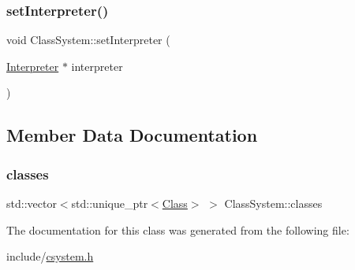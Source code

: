 \subsubsection{\texorpdfstring{set\+Interpreter()}{setInterpreter()}}
{\footnotesize\ttfamily void Class\+System\+::set\+Interpreter (\begin{DoxyParamCaption}\item[{\hyperlink{classInterpreter}{Interpreter} $\ast$}]{interpreter }\end{DoxyParamCaption})}



\subsection{Member Data Documentation}
\mbox{\label{classClassSystem_afdfbb54eb10abf323371cb9bb4f639a2}} 
\subsubsection{\texorpdfstring{classes}{classes}}
{\footnotesize\ttfamily std\+::vector$<$std\+::unique\+\_\+ptr$<$\hyperlink{classClass}{Class}$>$ $>$ Class\+System\+::classes}



The documentation for this class was generated from the following file\+:\begin{DoxyCompactItemize}
\item 
include/\hyperlink{csystem_8h}{csystem.\+h}\end{DoxyCompactItemize}

